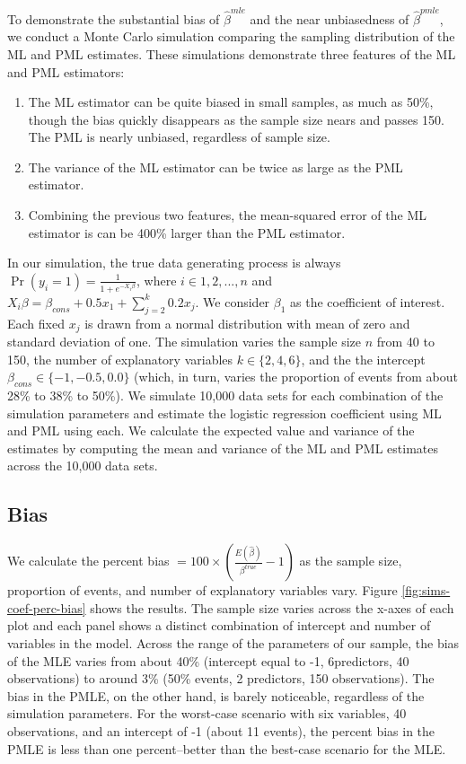 \documentclass[12pt]{article}
\begin{document}
To demonstrate the substantial bias of $\hat{\beta}^{mle}$ and the near unbiasedness of $\hat{\beta}^{pmle}$, we conduct a Monte Carlo simulation comparing the sampling distribution of the ML and PML estimates.
These simulations demonstrate three features of the ML and PML estimators:
\begin{enumerate}
\item The ML estimator can be quite biased in small samples, as much as 50\%, though the bias quickly disappears as the sample size nears and passes 150. The PML is nearly unbiased, regardless of sample size.
\item The variance of the ML estimator can be twice as large as the PML estimator.
\item Combining the previous two features, the mean-squared error of the ML estimator is can be 400\% larger than the PML estimator.
\end{enumerate}
In our simulation, the true data generating process is always $\Pr(y_i = 1) = \frac{1}{1 + e^{-X_i \beta}}$, where $i \in 1, 2,..., n$ and $X_i \beta = \beta_{cons} + 0.5 x_1 + \sum_{j = 2}^k 0.2 x_j$. 
We consider $\beta_1$ as the coefficient of interest.
Each fixed $x_j$ is drawn from a normal distribution with mean of zero and standard deviation of one. 
The simulation varies the sample size $n$ from 40 to 150, the number of explanatory variables $k \in \{2, 4, 6\}$, and the the intercept $\beta_{cons} \in \{-1, -0.5, 0.0\}$ (which, in turn, varies the proportion of events from about 28\% to 38\% to 50\%). 
We simulate 10,000 data sets for each combination of the simulation parameters and estimate the logistic regression coefficient using ML and PML using each.
We calculate the expected value and variance of the estimates by computing the mean and variance of the ML and PML estimates across the 10,000 data sets.

\subsection*{Bias}

We calculate the percent bias $= 100 \times \left(\frac{E(\hat{\beta})}{\beta^{true}} - 1 \right)$ as the sample size, proportion of events, and number of explanatory variables vary.  Figure \ref{fig:sims-coef-perc-bias} shows the results. The sample size varies across the x-axes of each plot and each panel shows a distinct combination of intercept and number of variables in the model. Across the range of the parameters of our sample, the bias of the MLE varies from about 40\% (intercept equal to -1, 6predictors, 40 observations) to around 3\% (50\% events, 2 predictors, 150 observations). The bias in the PMLE, on the other hand, is barely noticeable, regardless of the simulation parameters. For the worst-case scenario with six variables, 40 observations, and an intercept of -1 (about 11 events), the percent bias in the PMLE is less than one percent--better than the best-case scenario for the MLE.
\end{document}
